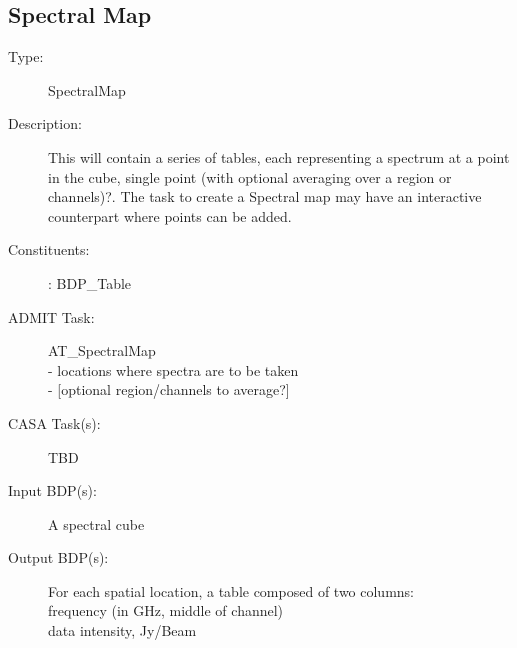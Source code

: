 \subsection{Spectral Map}
\begin{description}
\item[Type:] SpectralMap
\item[Description:]

This will contain a series of tables, each representing a spectrum at a
point in the cube, single point (with optional averaging over a region
or channels)?.  The task to create a Spectral map may have an interactive 
counterpart where points can be added.

\item[Constituents:]: BDP\_Table

\item[ADMIT Task:] AT\_SpectralMap \\
   - locations where spectra are to be taken \\
   - [optional region/channels to average?] 

\item[CASA Task(s):]  TBD

\item[Input BDP(s):]
A spectral cube 

\item[Output BDP(s):]

For each spatial location, a table composed of two columns: \\
   frequency (in GHz, middle of channel) \\
   data      intensity, Jy/Beam 
\end{description}
